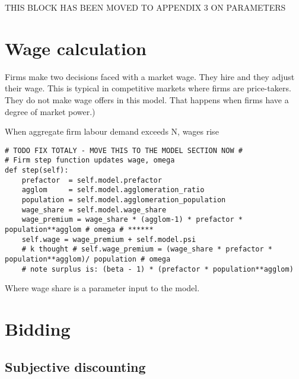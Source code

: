 {\color{orange} THIS BLOCK HAS BEEN MOVED TO APPENDIX 3 ON PARAMETERS

\section{Wage calculation}
Firms make two decisions faced with a market wage. They hire and they adjust their wage. This is typical in \glspl{competitive market} where firms are price-takers. They do not make  wage offers in this model. That happens when firms have a degree of market power.)


When aggregate firm labour demand exceeds N, wages rise 
\begin{lstlisting}
# TODO FIX TOTALY - MOVE THIS TO THE MODEL SECTION NOW #
# Firm step function updates wage, omega
def step(self):
    prefactor  = self.model.prefactor
    agglom     = self.model.agglomeration_ratio
    population = self.model.agglomeration_population
    wage_share = self.model.wage_share  
    wage_premium = wage_share * (agglom-1) * prefactor * population**agglom # omega # ****** 
    self.wage = wage_premium + self.model.psi
    # k thought # self.wage_premium = (wage_share * prefactor * population**agglom)/ population # omega    
    # note surplus is: (beta - 1) * (prefactor * population**agglom)
\end{lstlisting}

Where wage share is a parameter input to the model.

\section{Bidding}
\subsection{Subjective discounting}

}
